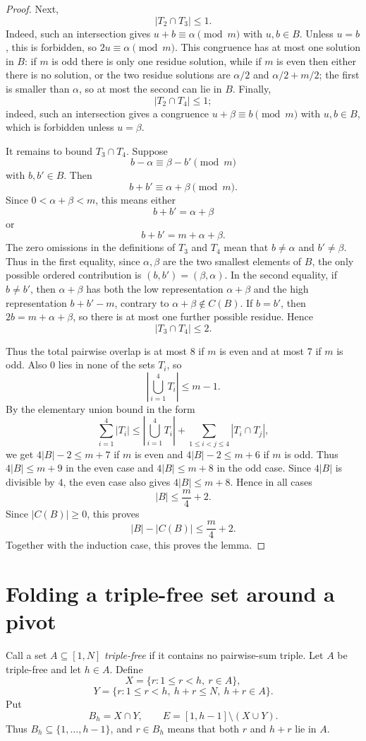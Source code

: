\documentclass[11pt]{amsart}
\theoremstyle{definition}
\begin{document}
\begin{proof}
Next,
\[
  |T_2\cap T_3|\leq 1.
\]
Indeed, such an intersection gives $u+b\equiv \alpha\pmod m$ with $u,b\in B$. Unless $u=b$, this is forbidden, so $2u\equiv\alpha\pmod m$. This congruence has at most one solution in $B$: if $m$ is odd there is only one residue solution, while if $m$ is even then either there is no solution, or the two residue solutions are $\alpha/2$ and $\alpha/2+m/2$; the first is smaller than $\alpha$, so at most the second can lie in $B$.
Finally,
\[
  |T_2\cap T_4|\leq 1;
\]
indeed, such an intersection gives a congruence $u+\beta\equiv b\pmod m$ with $u,b\in B$, which is forbidden unless $u=\beta$.

It remains to bound $T_3\cap T_4$. Suppose
\[
  b-\alpha\equiv \beta-b'\pmod m
\]
with $b,b'\in B$. Then
\[
  b+b'\equiv \alpha+\beta\pmod m.
\]
Since $0<\alpha+\beta<m$, this means either
\[
  b+b'=\alpha+\beta
\]
or
\[
  b+b'=m+\alpha+\beta.
\]
The zero omissions in the definitions of $T_3$ and $T_4$ mean that $b\neq\alpha$ and $b'\neq\beta$. Thus in the first equality, since $\alpha,\beta$ are the two smallest elements of $B$, the only possible ordered contribution is $(b,b')=(\beta,\alpha)$. In the second equality, if $b\neq b'$, then $\alpha+\beta$ has both the low representation $\alpha+\beta$ and the high representation $b+b'-m$, contrary to $\alpha+\beta\notin C(B)$. If $b=b'$, then $2b=m+\alpha+\beta$, so there is at most one further possible residue. Hence
\[
  |T_3\cap T_4|\leq 2.
\]

Thus the total pairwise overlap is at most $8$ if $m$ is even and at most $7$ if $m$ is odd. Also $0$ lies in none of the sets $T_i$, so
\[
  \left|\bigcup_{i=1}^4T_i\right|\leq m-1.
\]
By the elementary union bound in the form
\[
  \sum_{i=1}^4 |T_i|
  \leq \left|\bigcup_{i=1}^4T_i\right|+
  \sum_{1\leq i<j\leq 4}|T_i\cap T_j|,
\]
we get $4|B|-2\leq m+7$ if $m$ is even and $4|B|-2\leq m+6$ if $m$ is odd. Thus $4|B|\leq m+9$ in the even case and $4|B|\leq m+8$ in the odd case. Since $4|B|$ is divisible by $4$, the even case also gives $4|B|\leq m+8$. Hence in all cases
\[
  |B|\leq \frac m4+2.
\]
Since $|C(B)|\geq 0$, this proves
\[
  |B|-|C(B)|\leq \frac m4+2.
\]
Together with the induction case, this proves the lemma.
\end{proof}

\section{Folding a triple-free set around a pivot}

Call a set $A\subseteq[1,N]$ \emph{triple-free} if it contains no pairwise-sum triple. Let $A$ be triple-free and let $h\in A$. Define
\[
  X=\{r:1\leq r<h,\ r\in A\},
\]
\[
  Y=\{r:1\leq r<h,\ h+r\leq N,\ h+r\in A\}.
\]
Put
\[
  B_h=X\cap Y,
  \qquad
  E=[1,h-1]\setminus(X\cup Y).
\]
Thus $B_h\subseteq\{1,\ldots,h-1\}$, and $r\in B_h$ means that both $r$ and $h+r$ lie in $A$.
\end{document}
